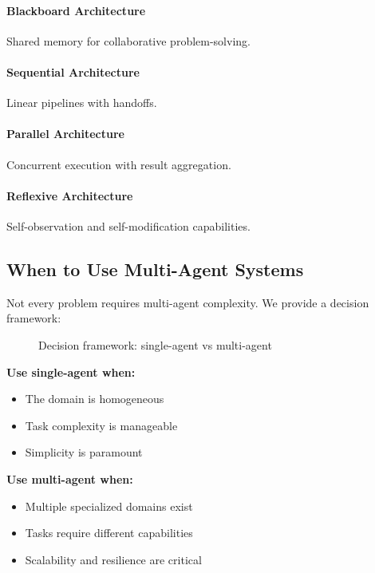 \documentclass[11pt,a4paper]{article}
\theoremstyle{definition}
\theoremstyle{remark}
\begin{document}
\paragraph{Blackboard Architecture} Shared memory for collaborative problem-solving.

\paragraph{Sequential Architecture} Linear pipelines with handoffs.

\paragraph{Parallel Architecture} Concurrent execution with result aggregation.

\paragraph{Reflexive Architecture} Self-observation and self-modification capabilities.

\subsection{When to Use Multi-Agent Systems}

Not every problem requires multi-agent complexity. We provide a decision framework:

\begin{figure}[H]
    \centering
    
    \caption{Decision framework: single-agent vs multi-agent}
    \label{fig:single-vs-multi}
\end{figure}

\textbf{Use single-agent when:}
\begin{itemize}
    \item The domain is homogeneous
    \item Task complexity is manageable
    \item Simplicity is paramount
\end{itemize}

\textbf{Use multi-agent when:}
\begin{itemize}
    \item Multiple specialized domains exist
    \item Tasks require different capabilities
    \item Scalability and resilience are critical
\end{itemize}
\end{document}
